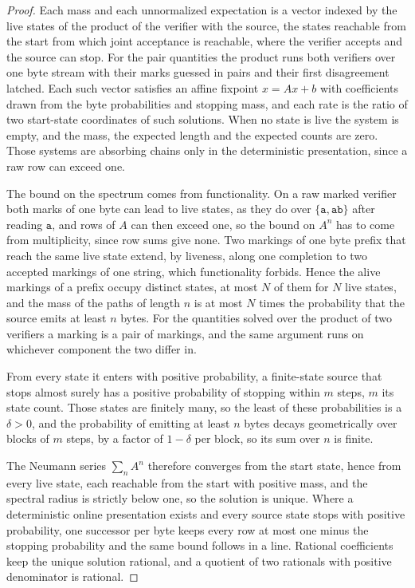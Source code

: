 \documentclass[11pt,a4paper]{article}
\theoremstyle{definition}
\theoremstyle{plain}
\newcommand{\code}[1]{\texttt{#1}}
\begin{document}
\begin{proof}
Each mass and each unnormalized expectation is a vector indexed by the live states of the product of the verifier with
the source, the states reachable from the start from which joint acceptance is reachable, where the verifier accepts and
the source can stop. For the pair quantities the product runs both verifiers over one byte stream with their marks
guessed in pairs and their first disagreement latched. Each such vector satisfies an affine fixpoint $x = Ax + b$ with
coefficients drawn from the byte probabilities and stopping mass, and each rate is the ratio of two start-state
coordinates of such solutions. When no state is live the system is empty, and the mass, the expected length and the
expected counts are zero. Those systems are absorbing chains only in the deterministic presentation, since a raw row can
exceed one.

The bound on the spectrum comes from functionality. On a raw marked verifier both marks of one byte can lead to live
states, as they do over $\{\code{a}, \code{ab}\}$ after reading $\code{a}$, and rows of $A$ can then exceed one, so the
bound on $A^{n}$ has to come from multiplicity, since row sums give none. Two markings of one byte prefix that reach the
same live state extend, by liveness, along one completion to two accepted markings of one string, which functionality
forbids. Hence the alive markings of a prefix occupy distinct states, at most $N$ of them for $N$ live states, and the
mass of the paths of length $n$ is at most $N$ times the probability that the source emits at least $n$ bytes. For the
quantities solved over the product of two verifiers a marking is a pair of markings, and the same argument runs on
whichever component the two differ in.

From every state it enters with positive probability, a finite-state source that stops almost surely has a positive
probability of stopping within $m$ steps, $m$ its state count. Those states are finitely many, so the least of these
probabilities is a $\delta > 0$, and the probability of emitting at least $n$ bytes decays geometrically over blocks of
$m$ steps, by a factor of $1 - \delta$ per block, so its sum over $n$ is finite.

The Neumann series $\sum_n A^{n}$ therefore converges from the start state, hence from every live state, each reachable
from the start with positive mass, and the spectral radius is strictly below one, so the solution is unique. Where a
deterministic online presentation exists and every source state stops with positive probability, one successor per byte
keeps every row at most one minus the stopping probability and the same bound follows in a line. Rational coefficients
keep the unique solution rational, and a quotient of two rationals with positive denominator is rational. \end{proof}
\end{document}
